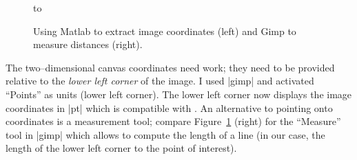 {{\begin{figure}
\noindent
\hbox to %


\caption{Using Matlab to extract image coordinates (left) and Gimp to measure distances (right).}
\label{fig:plotgraphics3d}
\end{figure}

The two--dimensional canvas coordinates need work; they need to be provided relative to the \emph{lower left corner} of the image. I used |gimp| and activated ``Points'' as units (lower left corner). The lower left corner now displays the image coordinates in |pt| which is compatible with \PGFPlots. An alternative to pointing onto coordinates is a measurement tool; compare Figure~\ref{fig:plotgraphics3d} (right) for the ``Measure'' tool in |gimp| which allows to compute the length of a line (in our case, the length of the lower left corner to the point of interest).

}}
